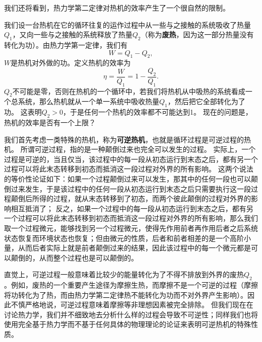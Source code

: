 \documentclass[hyperref, UTF8, a4paper]{ctexart}
\begin{document}
我们还将看到，热力学第二定律对热机的效率产生了一个很自然的限制。

我们设一台热机在它的循环往复的运作过程中从一些与之接触的系统吸收了热量$Q_1$，又向一些与之接触的系统释放了热量$Q_2$（称为\textbf{废热}，因为这一部分热量没有转化为功）。由热力学第一定律，我们有
\begin{equation}
    W = Q_1 - Q_2,
\end{equation}
$W$是热机对外做的功。定义热机的效率为
\begin{equation}
    \eta = \frac{W}{Q_1} = 1 - \frac{Q_2}{Q_1}.
    \label{eq:heat-efficienty}
\end{equation}
$Q_2$不可能是零，否则在热机的一个循环中，若我们将热机从中吸热的系统看成一个总系统，那么热机就从一个单一系统中吸收热量$Q_1$，然后把它全部转化为了功。
这表明$Q_2>0$，于是任何一个热机的效率都不可能达到1。
现在的问题是，热机的效率是否有一个上限？

我们首先考虑一类特殊的热机，称为\textbf{可逆热机}，也就是循环过程是可逆过程的热机。
所谓可逆过程，指的是一种颠倒过来也完全可以发生的过程。
实际上，一个过程是可逆的，当且仅当，该过程中的每一段从初态运行到末态之后，都有另一个过程可以将此末态转移到初态而抵消这一段过程对外界的所有影响。
这两个说法的等价性论证如下：如果一个过程颠倒过来可以发生，那其中的任何一段也可以颠倒过来发生，于是该过程中的任何一段从初态运行到末态之后只需要执行这一段过程颠倒后所得的过程，就从末态转移到了初态，而两个彼此颠倒的过程对外界的影响相互抵消了；
反之，如果一个过程中的每一段从初态运行到末态之后，都有另一个过程可以将此末态转移到初态而抵消这一段过程对外界的所有影响，那么我们取一个过程微元，能够找到另一个过程微元，使得先作用前者再作用后者之后系统状态恢复而环境状态也恢复；但由微元的性质，后者和前者相差的是一个高阶小量，从而后者实际上就是前者颠倒过来的结果，因此该过程中的每一个微元都是可以颠倒的，从而整个过程也是可以颠倒的。

直觉上，可逆过程一般意味着比较少的能量转化为了不得不排放到外界的废热$Q_2$。例如，废热的一个重要产生途径为摩擦生热，而摩擦不是一个可逆的过程（摩擦将功转化为了热，而由热力学第二定律热不能转化为功而不对外界产生影响）。因此不慎严格地说，可逆过程意味着摩擦等非理想因素被完全排除。
但我们现在在讨论热力学，我们并不细致地去分析什么样的过程会导致不可逆性；同样我们也将使用完全基于热力学而不基于任何具体的物理理论的论证来表明可逆热机的特殊性质。
\end{document}
